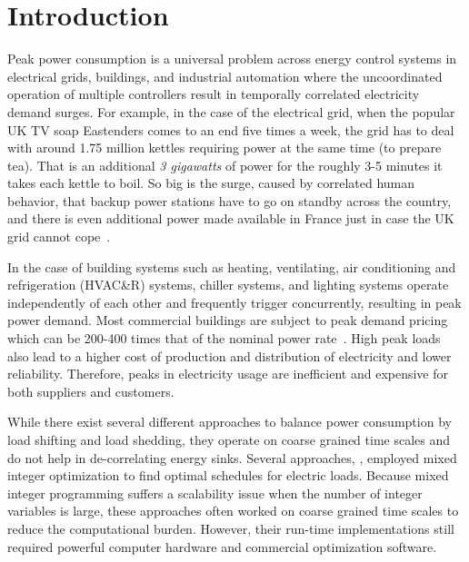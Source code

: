 \section{Introduction}
\label{sec:intro}

Peak power consumption is a universal problem across energy control systems in electrical grids, buildings, %
and industrial automation where the uncoordinated operation of multiple controllers result in  temporally correlated electricity demand surges. For example, in the case of the electrical grid, when the popular UK TV soap Eastenders comes to an end five times a week, the grid has to deal with around 1.75 million kettles requiring power at the same time (to prepare tea). That is an additional \emph{3 gigawatts} of power for the roughly 3-5 minutes it takes each kettle to boil. So big is the surge, caused by correlated human behavior, that backup power stations have to go on standby across the country, and there is even additional power made available in France just in case the UK grid cannot cope~\cite{tvpickup}. 

In the case of building systems such as heating, ventilating, air conditioning and refrigeration (HVAC\&R) systems, chiller systems, and lighting systems operate independently of each other and frequently trigger concurrently, resulting in peak power demand. Most commercial buildings are subject to peak demand pricing which can be 200-400 times that of the nominal power rate~\cite{trfpeco}. High peak loads also lead to a higher cost of production and distribution of electricity and lower reliability. Therefore, peaks in electricity usage are inefficient and expensive for both suppliers and customers.


While there exist several different approaches to balance power consumption by load shifting and load shedding, they operate on coarse grained time scales and do not help in de-correlating energy sinks.
Several approaches, \eg \cite{sou2011scheduling,zhang2011optimal}, employed mixed integer optimization to find optimal schedules for electric loads.
Because mixed integer programming suffers a scalability issue when the number of integer variables is large, these approaches often worked on coarse grained time scales to reduce the computational burden.
However, their run-time implementations still required powerful computer hardware and commercial optimization software.


